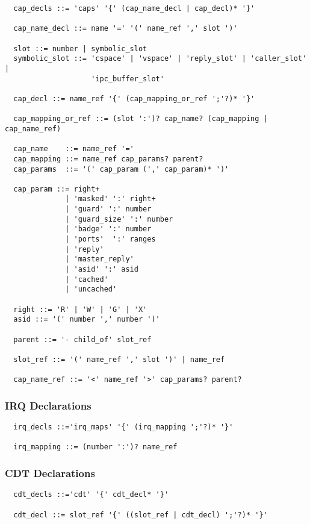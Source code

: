 \documentclass[a4paper,11pt]{article}
\begin{document}
\begin{verbatim}
  cap_decls ::= 'caps' '{' (cap_name_decl | cap_decl)* '}'

  cap_name_decl ::= name '=' '(' name_ref ',' slot ')'

  slot ::= number | symbolic_slot
  symbolic_slot ::= 'cspace' | 'vspace' | 'reply_slot' | 'caller_slot' |
                    'ipc_buffer_slot'

  cap_decl ::= name_ref '{' (cap_mapping_or_ref ';'?)* '}'

  cap_mapping_or_ref ::= (slot ':')? cap_name? (cap_mapping | cap_name_ref)

  cap_name    ::= name_ref '='
  cap_mapping ::= name_ref cap_params? parent?
  cap_params  ::= '(' cap_param (',' cap_param)* ')' 

  cap_param ::= right+
              | 'masked' ':' right+
              | 'guard' ':' number
              | 'guard_size' ':' number
              | 'badge' ':' number
              | 'ports'  ':' ranges
              | 'reply'
              | 'master_reply'
              | 'asid' ':' asid
              | 'cached'
              | 'uncached'

  right ::= 'R' | 'W' | 'G' | 'X'
  asid ::= '(' number ',' number ')'

  parent ::= '- child_of' slot_ref

  slot_ref ::= '(' name_ref ',' slot ')' | name_ref

  cap_name_ref ::= '<' name_ref '>' cap_params? parent?
\end{verbatim}


\subsubsection{IRQ Declarations}

\begin{verbatim}
  irq_decls ::='irq_maps' '{' (irq_mapping ';'?)* '}'

  irq_mapping ::= (number ':')? name_ref
\end{verbatim}


\subsubsection{CDT Declarations}

\begin{verbatim}
  cdt_decls ::='cdt' '{' cdt_decl* '}'

  cdt_decl ::= slot_ref '{' ((slot_ref | cdt_decl) ';'?)* '}'
\end{verbatim}
\end{document}
